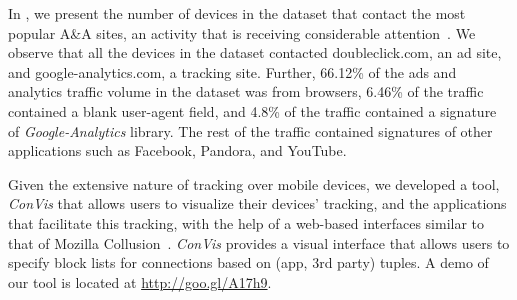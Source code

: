 In , we present the number of devices in the \mobWild dataset that contact the most popular A\&A sites, an activity that is receiving considerable attention~\cite{roesner:webtrackers,leontiadis:mobileads,vallina-rod:ads}.
We observe that all the devices in the \mobWild dataset contacted doubleclick.com, an ad site, and google-analytics.com, a tracking site. 
Further, 66.12\% of the ads and analytics traffic volume in the \mobWild dataset was from browsers, 6.46\% of the
traffic contained a blank user-agent field, and 4.8\% of the traffic contained a signature of \emph{Google-Analytics} library.
The rest of the traffic contained signatures of other applications such as Facebook, Pandora, and YouTube.

Given the extensive nature of tracking over mobile devices, we developed a tool, \emph{ConVis} that allows users to visualize their devices' tracking, and the applications that facilitate this tracking, with the help of a web-based interfaces similar to that of Mozilla Collusion~\cite{collusion}. \emph{ConVis} provides a visual interface that allows 
 users to specify block lists for connections based on (app, 3rd party) tuples. A demo of our tool is 
 located at \url{http://goo.gl/A17h9}. 







